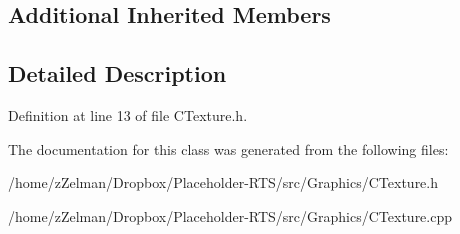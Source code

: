 \subsection*{Additional Inherited Members}


\subsection{Detailed Description}


Definition at line 13 of file C\-Texture.\-h.



The documentation for this class was generated from the following files\-:\begin{DoxyCompactItemize}
\item 
/home/z\-Zelman/\-Dropbox/\-Placeholder-\/\-R\-T\-S/src/\-Graphics/C\-Texture.\-h\item 
/home/z\-Zelman/\-Dropbox/\-Placeholder-\/\-R\-T\-S/src/\-Graphics/C\-Texture.\-cpp\end{DoxyCompactItemize}
